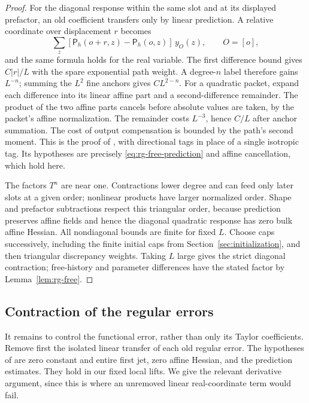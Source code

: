 \begin{proof}
For the diagonal response within the same slot and at its displayed
prefactor, an old coefficient transfers only by linear prediction.
A relative coordinate over displacement $r$ becomes
\[
 \sum_z[\mathsf P_h(o+r,z)-\mathsf P_h(o,z)]\,y_O(z),
                  \qquad O=[o],
\]
and the same formula holds for the real variable.  The first difference
bound gives $C|r|/L$ with the spare exponential path weight.  A degree-$n$
label therefore gains $L^{-n}$; summing the $L^2$ fine anchors gives
$CL^{2-n}$.  For a quadratic packet, expand each difference into its
linear affine part and a second-difference remainder.  The product of
the two affine parts cancels before absolute values are taken, by the
packet's affine normalization.  The remainder costs $L^{-3}$, hence
$C/L$ after anchor summation.  The cost of output compensation is bounded
by the path's second moment.  This is the proof of
\cite[Appendix ``A fixed coefficient norm for the diagonal canonical
map'', Lemma ``One norm and constants chosen before the block
size'']{SharpO4}, with directional tags in place of a single isotropic
tag.  Its hypotheses are precisely
\eqref{eq:rg-free-prediction} and affine cancellation, which hold here.

The factors $T^n$ are near one.  Contractions lower degree and can feed
only later slots at a given order; nonlinear products have larger
normalized order.  Shape and prefactor subtractions respect this
triangular order, because prediction preserves affine fields and hence
the diagonal quadratic response has zero bulk affine Hessian.  All
nondiagonal bounds are finite for fixed $L$.  Choose caps successively,
including the finite initial caps from Section~\ref{sec:initialization},
and then triangular discrepancy weights.  Taking $L$ large gives the
strict diagonal contraction; free-history and parameter differences
have the stated factor by Lemma~\ref{lem:rg-free}.
\end{proof}

\subsection{Contraction of the regular errors}

It remains to control the functional error, rather than only its Taylor
coefficients.  Remove first the isolated linear transfer of each old
regular error.  The hypotheses of
\cite[Lemma ``Contraction of old regular errors'', in Section ``An exact
renormalization map'']{SharpO4} are zero constant and entire first jet,
zero affine Hessian, and the prediction estimates.  They hold in our
fixed local lifts.  We give the relevant derivative argument, since
this is where an unremoved linear real-coordinate term would fail.


